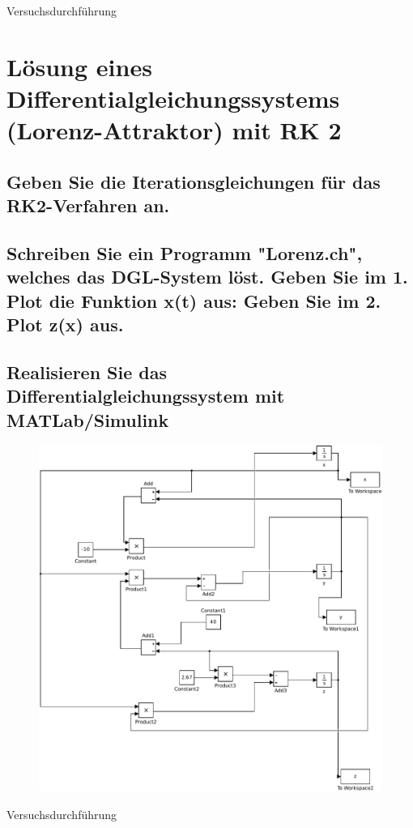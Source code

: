 \documentclass[10pt,a4paper]{article}
\begin{document}
\begin{center}
\begin{large}
Versuchsdurchführung
\end{large}
\end{center}

\section{Lösung eines Differentialgleichungssystems (Lorenz-Attraktor) mit RK 2}
\subsection{Geben Sie die Iterationsgleichungen für das RK2-Verfahren an.}
\subsection{Schreiben Sie ein Programm "Lorenz.ch", welches das DGL-System löst.
Geben Sie im 1. Plot die Funktion x(t) aus:
Geben Sie im 2. Plot z(x) aus.}
\subsection{Realisieren Sie das Differentialgleichungssystem mit MATLab/Simulink}
\begin{figure}[h]
\centering
\includegraphics[width=0.9\linewidth]{../screenshots/3}
\end{figure}

\begin{center}
\begin{large}
Versuchsdurchführung
\end{large}
\end{center}
\end{document}
